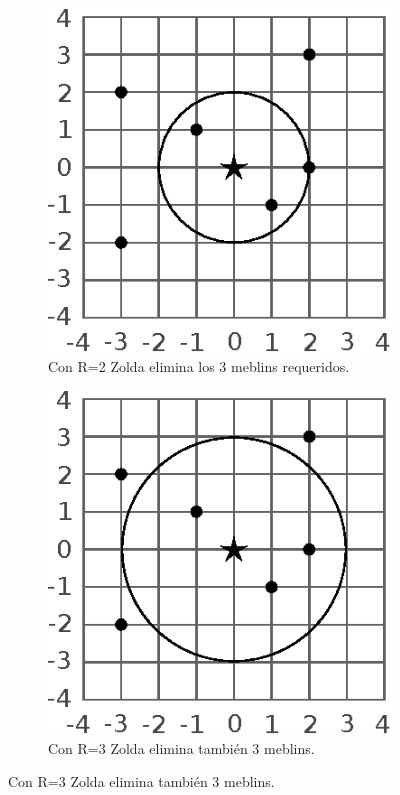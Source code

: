 \documentclass{oci}
\begin{document}
\begin{problemDescription}
  \begin{figure}[h]
    \centering
    \begin{subfigure}{0.3\textwidth}
      \centering
      \includegraphics[scale=0.8]{zolda2}
      \caption*{Con R=2 Zolda elimina los 3 meblins requeridos.}
    \end{subfigure}
    \hspace{3em}
    \begin{subfigure}{0.3\textwidth}
      \centering
      \includegraphics[scale=0.8]{zolda3}
      \caption*{Con R=3 Zolda elimina también 3 meblins.}
    \end{subfigure}
  \end{figure}

\end{problemDescription}
\end{document}
